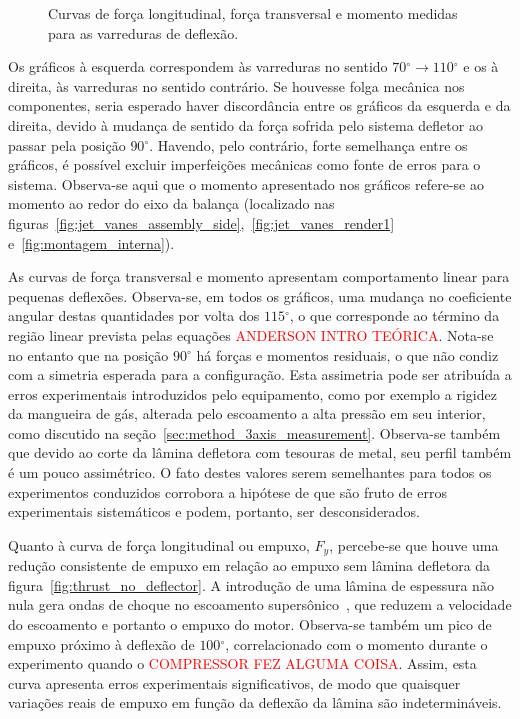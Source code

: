 \begin{figure}[htbp]
\begin{subfigure}{0.49\textwidth}
    \end{subfigure}
    \caption{Curvas de força longitudinal, força transversal e momento medidas para as varreduras de deflexão.}\label{fig:deflection_forces}
\end{figure}

Os gráficos à esquerda correspondem às varreduras no sentido \(70\mathrm{^{\circ}} \rightarrow 110\mathrm{^\circ}\) e os à direita, às varreduras no sentido contrário. Se houvesse folga mecânica nos componentes, seria esperado haver discordância entre os gráficos da esquerda e da direita, devido à mudança de sentido da força sofrida pelo sistema defletor ao passar pela posição \(90\mathrm{^{\circ}}\). Havendo, pelo contrário, forte semelhança entre os gráficos, é possível excluir imperfeições mecânicas como fonte de erros para o sistema. Observa-se aqui que o momento apresentado nos gráficos refere-se ao momento ao redor do eixo da balança (localizado nas figuras~\ref{fig:jet_vanes_assembly_side},~\ref{fig:jet_vanes_render1} e~\ref{fig:montagem_interna}).

As curvas de força transversal e momento apresentam comportamento linear para pequenas deflexões. Observa-se, em todos os gráficos, uma mudança no coeficiente angular destas quantidades por volta dos \(115\mathrm{^{\circ}}\), o que corresponde ao término da região linear prevista pelas equações \textcolor{red}{ANDERSON INTRO TEÓRICA}. Nota-se no entanto que na posição \(90\mathrm{^\circ}\) há forças e momentos residuais, o que não condiz com a simetria esperada para a configuração. Esta assimetria pode ser atribuída a erros experimentais introduzidos pelo equipamento, como por exemplo a rigidez da mangueira de gás, alterada pelo escoamento a alta pressão em seu interior, como discutido na seção~\ref{sec:method_3axis_measurement}. Observa-se também que devido ao corte da lâmina defletora com tesouras de metal, seu perfil também é um pouco assimétrico. O fato destes valores serem semelhantes para todos os experimentos conduzidos corrobora a hipótese de que são fruto de erros experimentais sistemáticos e podem, portanto, ser desconsiderados.

Quanto à curva de força longitudinal ou empuxo, \(F_y\), percebe-se que houve uma redução consistente de empuxo em relação ao empuxo sem lâmina defletora da figura~\ref{fig:thrust_no_deflector}. A introdução de uma lâmina de espessura não nula gera ondas de choque no escoamento supersônico~\cite{anderson}, que reduzem a velocidade do escoamento e portanto o empuxo do motor. Observa-se também um pico de empuxo próximo à deflexão de \(100\mathrm{^\circ}\), correlacionado com o momento durante o experimento quando o \textcolor{red}{COMPRESSOR FEZ ALGUMA COISA}\@. Assim, esta curva apresenta erros experimentais significativos, de modo que quaisquer variações reais de empuxo em função da deflexão da lâmina são indetermináveis.


